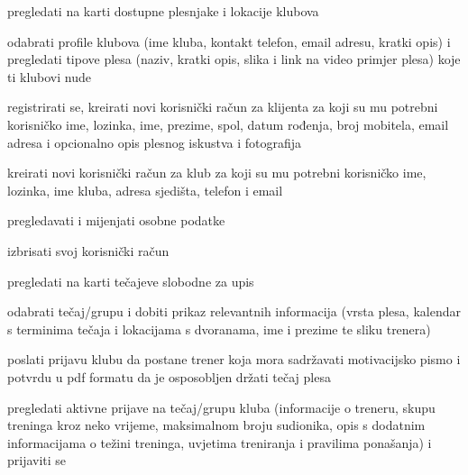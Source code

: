 			
			\begin{packed_enum}
				\item  {}
				
				\begin{packed_enum}
					\item pregledati na karti dostupne plesnjake i lokacije klubova
					\item odabrati profile klubova (ime kluba, kontakt telefon, email adresu, kratki opis)  i pregledati tipove plesa (naziv, kratki opis, slika i link na video primjer plesa) koje ti klubovi nude
					\item registrirati se, kreirati novi korisnički račun za klijenta za koji su mu potrebni korisničko ime, lozinka, ime, prezime, spol, datum rođenja, broj mobitela, email adresa i opcionalno opis plesnog iskustva i fotografija
					\item kreirati novi korisnički račun za klub za koji su mu potrebni korisničko ime, lozinka, ime kluba, adresa sjedišta, telefon i email

					
				\end{packed_enum}
			
				\item  {}
				
				\begin{packed_enum}
					
					\item pregledavati i mijenjati osobne podatke
					\item izbrisati svoj korisnički račun
					\item  pregledati na karti tečajeve slobodne za upis 
					\item odabrati tečaj/grupu i dobiti prikaz relevantnih informacija (vrsta plesa, kalendar s terminima tečaja i lokacijama s dvoranama, ime i prezime te sliku trenera)
					\item poslati prijavu klubu da postane trener koja mora sadržavati motivacijsko pismo i potvrdu u pdf formatu da je osposobljen držati tečaj plesa
					\item pregledati aktivne prijave na tečaj/grupu kluba (informacije o treneru, skupu treninga kroz neko vrijeme, maksimalnom broju sudionika, opis s dodatnim informacijama o težini treninga, uvjetima treniranja i pravilima ponašanja) i prijaviti se

					
				\end{packed_enum}
			

\end{packed_enum}
